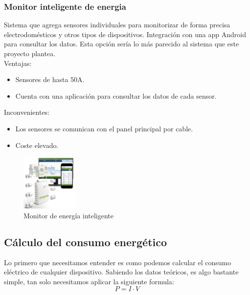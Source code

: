 \begin{titlepage}
\subsubsection{Monitor inteligente de energia}
Sistema que agrega sensores individuales para monitorizar de forma precisa electrodomésticos y otros tipos de dispositivos. Integración con una app Android para consultar los datos. Esta opción sería lo más parecido al sistema que este proyecto plantea.\\

Ventajas:
\begin{itemize}
	\item Sensores de hasta 50A.
	\item Cuenta con una aplicación para consultar los datos de cada sensor.
\end{itemize}

Inconvenientes:
\begin{itemize}
	\item Los sensores se comunican con el panel principal por cable.
	\item Coste elevado.
\end{itemize}
\begin{figure}[h!]
	\centering
	\includegraphics[width=0.25\textwidth]{imagenes/monitor_consumo.jpg}
	\caption{Monitor de energía inteligente\cite{monitor_inteligente_img}}
\end{figure}

\newpage

\subsection{Cálculo del consumo energético}
Lo primero que necesitamos entender es como podemos calcular el consumo eléctrico de cualquier dispositivo. Sabiendo los datos teóricos, es algo bastante simple, tan solo necesitamos aplicar la siguiente formula: \\
\begin{equation}
\label{eq:consumo}
P = I \cdot V
\end{equation}


\end{titlepage}
